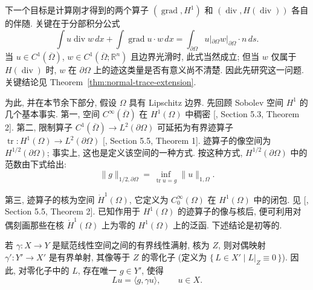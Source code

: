 {下一个目标是计算刚才得到的两个算子 $(\operatorname{grad},H^1)$ 和 $(\operatorname{div},H(\operatorname{div}))$ 各自的伴随. 关键在于分部积分公式}
\begin{equation}\label{eq:grad-div-classical-green}
\int u\operatorname{div}w\,dx+\int\operatorname{grad}u\cdot w\,dx=\int_{\partial\Omega}u|_{\partial\Omega}w|_{\partial\Omega}\cdot n\,ds.
\end{equation}
{当 $u\in C^1(\overline\Omega)$, $w\in C^1(\overline\Omega;\mathbb R^n)$ 且边界光滑时, 此式当然成立; 但当 $w$ 仅属于 $H(\operatorname{div})$ 时, $w$ 在 $\partial\Omega$ 上的迹这类量是否有意义尚不清楚. 因此先研究这一问题. 关键结论见 Theorem~\ref{thm:normal-trace-extension}.}

{为此, 并在本节余下部分, 假设 $\Omega$ 具有 Lipschitz 边界. 先回顾 Sobolev 空间 $H^1$ 的几个基本事实. 第一, 空间 $C^\infty(\overline\Omega)$ 在 $H^1(\Omega)$ 中稠密 [, Section 5.3, Theorem 2]. 第二, 限制算子 $C^1(\overline\Omega)\to L^2(\partial\Omega)$ 可延拓为有界迹算子 $\operatorname{tr}:H^1(\Omega)\to L^2(\partial\Omega)$ [, Section 5.5, Theorem 1]. 迹算子的像空间为 $H^{1/2}(\partial\Omega)$; 事实上, 这也是定义该空间的一种方式. 按这种方式, $H^{1/2}(\partial\Omega)$ 中的范数由下式给出:}
\begin{equation}\label{eq:trace-quotient-norm}
\|g\|_{1/2,\partial\Omega}=\inf_{\operatorname{tr}u=g}\|u\|_{1,\Omega}.
\end{equation}

{第三, 迹算子的核为空间 $\mathring H^1(\Omega)$, 它定义为 $C_0^\infty(\Omega)$ 在 $H^1(\Omega)$ 中的闭包. 见 [, Section 5.5, Theorem 2]. 已知作用于 $H^1(\Omega)$ 的迹算子的像与核后, 便可利用对偶刻画那些在核 $\mathring H^1(\Omega)$ 上为零的 $H^1(\Omega)$ 上的泛函. 下述结论是初等的.}


\begin{Lemma}\label{lem:dual-surjection-annihilator}
{若 $\gamma:X\to Y$ 是赋范线性空间之间的有界线性满射, 核为 $Z$, 则对偶映射 $\gamma':Y'\to X'$ 是有界单射, 其像等于 $Z$ 的零化子 (定义为 $\{\,L\in X'\mid L|_Z\equiv0\,\}$). 因此, 对零化子中的 $L$, 存在唯一 $g\in Y'$, 使得}
\[
Lu=\langle g,\gamma u\rangle,\qquad u\in X.
\]
\end{Lemma}

